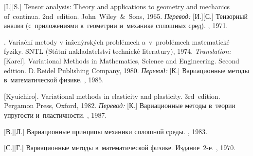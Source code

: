 \begin{thebibliography}{123}
\begin{otherlanguage}{russian}
[I.][S.] Tensor analysis: Theory and applications to geometry and mechanics of~continua. 2nd~edition. John~Wiley~\&~Sons, 1965. 
\emph{Перевод:} [И.][С.] Тензорный анализ (с~приложениями к~геометрии и~механике сплошных сред). \naukapublisher, 1971. 

%
%



. Varia\v{c}ní metody v in\v{z}en\'{y}rsk\'{y}ch probl\'{e}mech a~v~pro\-bl\'{e}\-mech matematick\'{e} fyziky. SNTL (St\'{a}tní nakladatelství technick\'{e} literatury), 1974. 
\emph{Translation:}
[Karel]. Variational Methods in Mathematics, Science and Engineering. Second edition. D.\,Reidel Publishing Company, 1980. 
\emph{Перевод:}
[К.] Вариационные методы в~математической физике. \mirpublisher, 1985. 

[Kyuichiro]. Variational methods in elasticity and plasticity. 3rd~edition. Pergamon Press, Oxford, 1982. 
\emph{Перевод:} [К.] Вариационные методы в~теории упругости и~пластичности. \mirpublisher, 1987. 

[В.][Л.] Вариационные принципы механики сплошной среды. \naukapublisher, 1983. 

[С.][Г.] Вариационные методы в~математической физике. Издание~2\hbox{-}е. \naukapublisher, 1970. 

%
%



\end{otherlanguage}
\end{thebibliography}
